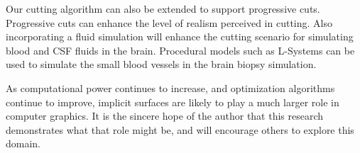Our cutting algorithm can also be extended to support progressive cuts. Progressive cuts can 
enhance the level of realism perceived in cutting. Also incorporating a fluid simulation will enhance the cutting 
scenario for simulating blood and CSF fluids in the brain. Procedural models such as L-Systems can be 
used to simulate the small blood vessels in the brain biopsy simulation. 

As computational power continues to increase, and optimization algorithms continue to improve, implicit 
surfaces are likely to play a much larger role in computer graphics. It is the sincere hope of the author 
that this research demonstrates what that role might be, and will encourage others to explore this domain.



